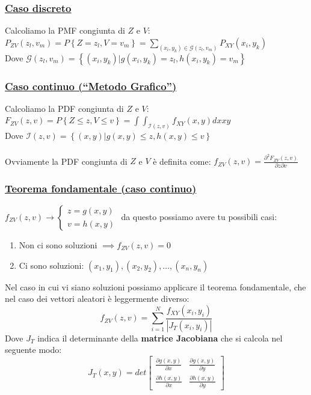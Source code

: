 \documentclass{article}
\begin{document}
\subsubsection{\underline{Caso discreto}}
Calcoliamo la PMF congiunta di $Z$ e $V$: \\
$P_{ZV}(z_l,v_m) = P \left\{ Z = z_l, V = v_m \right\} = \sum_{(x_i,y_k) \in \mathcal{G}(z_l,v_m)} P_{XY}(x_i,y_k)$ \\
Dove $\mathcal{G}(z_l,v_m) = \left\{ (x_i,y_k) | g(x_i,y_k) = z_l, h(x_i,y_k) = v_m \right\}$
\subsubsection{\underline{Caso continuo (“Metodo Grafico”)}}
Calcoliamo la PDF congiunta di $Z$ e $V$: \\
$F_{ZV}(z,v) = P \left\{ Z \leq z, V \leq v \right\} = \int \int_{\mathcal{I}(z,v)} f_{XY}(x,y) dx xy$ \\
Dove $\mathcal{I}(z,v) = \left\{ (x,y) | g(x,y) \leq z, h(x,y) \leq v\right\}$ \\ \\
Ovviamente la PDF congiunta di $Z$ e $V$ è definita come: $f_{ZV}(z,v) = \frac{\partial^2 F_{ZV}(z,v)}{\partial z \partial v}$
\subsubsection{\underline{Teorema fondamentale (caso continuo)}}
$f_{ZV}(z,v) \rightarrow \begin{cases}
    z = g(x,y) \\
    v = h(x,y)
\end{cases}$ da questo possiamo avere tu possibili casi:
\begin{enumerate}
    \item Non ci sono soluzioni $\implies f_{ZV}(z,v) = 0$
    \item Ci sono soluzioni: $(x_1,y_1), (x_2,y_2), \dots, (x_n,y_n)$
\end{enumerate}
Nel caso in cui vi siano soluzioni possiamo applicare il teorema fondamentale, che nel caso dei vettori aleatori è leggermente diverso: \\
\[f_{ZV}(z,v) = \sum_{i = 1}^{N} \frac{f_{XY}(x_i,y_i)}{\left| J_T(x_i,y_i)\right|}\]
Dove $J_T$ indica il determinante della \textbf{matrice Jacobiana} che si calcola nel seguente modo: 
\[J_T(x,y) = det \begin{bmatrix}
    \frac{\partial g(x,y)}{\partial x} & \frac{\partial g(x,y)}{\partial y} \\
    \frac{\partial h(x,y)}{\partial x} & \frac{\partial h(x,y)}{\partial y} 
\end{bmatrix}\]
\end{document}
